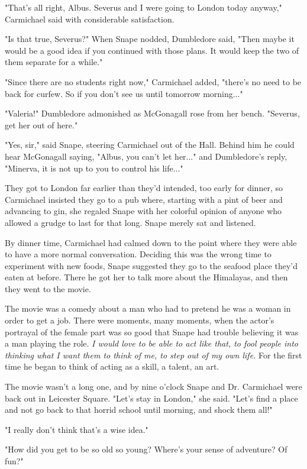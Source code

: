 \documentclass[a4paper,11pt]{article}
\begin{document}
"That's all right, Albus. Severus and I were going to London today anyway," Carmichael said with considerable satisfaction.

"Is that true, Severus?" When Snape nodded, Dumbledore said, "Then maybe it would be a good idea if you continued with those plans. It would keep the two of them separate for a while."

"Since there are no students right now," Carmichael added, "there's no need to be back for curfew. So if you don't see us until tomorrow morning..."

"Valeria!" Dumbledore admonished as McGonagall rose from her bench. "Severus, get her out of here."

"Yes, sir," said Snape, steering Carmichael out of the Hall. Behind him he could hear McGonagall saying, "Albus, you can't let her..." and Dumbledore's reply, "Minerva, it is not up to you to control his life..."

They got to London far earlier than they'd intended, too early for dinner, so Carmichael insisted they go to a pub where, starting with a pint of beer and advancing to gin, she regaled Snape with her colorful opinion of anyone who allowed a grudge to last for that long. Snape merely sat and listened.

By dinner time, Carmichael had calmed down to the point where they were able to have a more normal conversation. Deciding this was the wrong time to experiment with new foods, Snape suggested they go to the seafood place they'd eaten at before. There he got her to talk more about the Himalayas, and then they went to the movie.

The movie was a comedy about a man who had to pretend he was a woman in order to get a job. There were moments, many moments, when the actor's portrayal of the female part was so good that Snape had trouble believing it was a man playing the role. \emph{I would love to be able to act like that, to fool people into thinking what I want them to think of me, to step out of my own life.} For the first time he began to think of acting as a skill, a talent, an art.

The movie wasn't a long one, and by nine o'clock Snape and Dr. Carmichael were back out in Leicester Square. "Let's stay in London," she said. "Let's find a place and not go back to that horrid school until morning, and shock them all!"

"I really don't think that's a wise idea."

"How did you get to be so old so young? Where's your sense of adventure? Of fun?"
\end{document}
